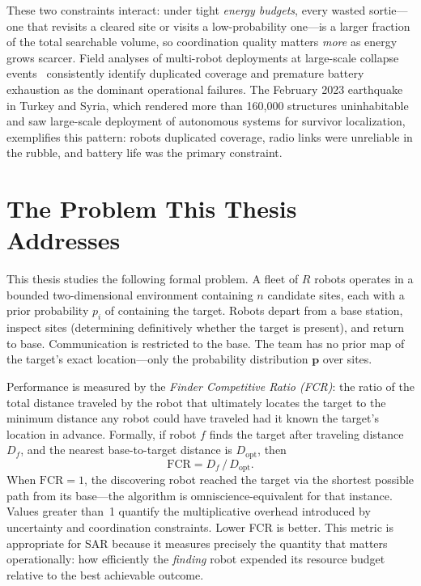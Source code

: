 \begin{doublespacing}
These two constraints interact: under tight \emph{energy budgets}, every
wasted sortie---one that revisits a cleared site or visits a
low-probability one---is a larger fraction of the total searchable
volume, so coordination quality matters \emph{more} as energy grows
scarcer.
Field analyses of multi-robot deployments at large-scale collapse
events~\citep{ACMSurveyMRTA2025} consistently identify duplicated
coverage and premature battery exhaustion as the dominant operational
failures.
The February 2023 earthquake in Turkey and Syria, which rendered more
than 160,000 structures uninhabitable and saw large-scale deployment
of autonomous systems for survivor localization, exemplifies this
pattern: robots duplicated coverage, radio links were unreliable in
the rubble, and battery life was the primary constraint.

\section{The Problem This Thesis Addresses}

This thesis studies the following formal problem.
A fleet of $R$ robots operates in a bounded two-dimensional environment
containing $n$ candidate sites, each with a prior probability $p_i$
of containing the target.
Robots depart from a base station, inspect sites (determining
definitively whether the target is present), and return to base.
Communication is restricted to the base.
The team has no prior map of the target's exact location---only the
probability distribution $\mathbf{p}$ over sites.

Performance is measured by the \emph{Finder Competitive Ratio (FCR)}:
the ratio of the total distance traveled by the robot that ultimately
locates the target to the minimum distance any robot could have
traveled had it known the target's location in advance.
Formally, if robot $f$ finds the target after traveling distance $D_f$,
and the nearest base-to-target distance is $D_{\mathrm{opt}}$, then
\[
  \mathrm{FCR} = D_f \,/\, D_{\mathrm{opt}}.
\]
When $\mathrm{FCR} = 1$, the discovering robot reached the target via
the shortest possible path from its base---the algorithm is
omniscience-equivalent for that instance.
Values greater than~1 quantify the multiplicative overhead introduced
by uncertainty and coordination constraints.
Lower FCR is better.
This metric is appropriate for SAR because it measures precisely the
quantity that matters operationally: how efficiently the \emph{finding}
robot expended its resource budget relative to the best achievable
outcome.


\end{doublespacing}
